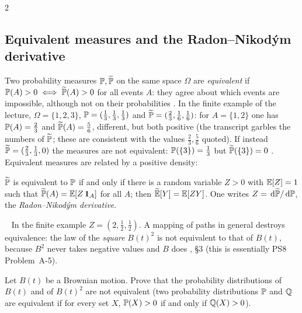 \begin{paracol}{2}
\subsection{Equivalent measures and the Radon--Nikod\'ym derivative}
Two probability measures $\mathbb{P},\widetilde{\mathbb{P}}$ on the same space $\Omega$ are \emph{equivalent} if $\mathbb{P}(A)>0\iff\widetilde{\mathbb{P}}(A)>0$ for all events $A$: they agree about which events are impossible, although not on their probabilities
. In the finite example of the lecture, $\Omega=\{1,2,3\}$, $\mathbb{P}=(\tfrac13,\tfrac13,\tfrac13)$ and $\widetilde{\mathbb{P}}=(\tfrac23,\tfrac16,\tfrac16)$: for $A=\{1,2\}$ one has $\mathbb{P}(A)=\tfrac23$ and $\widetilde{\mathbb{P}}(A)=\tfrac56$, different, but both positive
(the transcript garbles the numbers of $\widetilde{\mathbb{P}}$; these are consistent with the values $\tfrac23,\tfrac56$ quoted). If instead $\widetilde{\mathbb{P}}=(\tfrac23,\tfrac13,0)$ the measures are not equivalent: $\mathbb{P}(\{3\})=\tfrac13$ but $\widetilde{\mathbb{P}}(\{3\})=0$
. Equivalent measures are related by a positive density:

\begin{theorem}\label{ch17:thm-rn}
$\widetilde{\mathbb{P}}$ is equivalent to $\mathbb{P}$ if and only if there is a random variable $Z>0$ with $\mathbb{E}[Z]=1$ such that $\widetilde{\mathbb{P}}(A)=\mathbb{E}[Z\,\mathbf{1}_A]$ for all $A$; then $\widetilde{\mathbb{E}}[Y]=\mathbb{E}[ZY]$. One writes $Z=\,\mathrm{d}\widetilde{\mathbb{P}}/\,\mathrm{d}\mathbb{P}$, the \emph{Radon--Nikod\'ym derivative}.
\end{theorem}
\ \noindent
In the finite example $Z=(2,\tfrac12,\tfrac12)$. A mapping of paths in general destroys equivalence: the law of the \emph{square} $B(t)^2$ is not equivalent to that of $B(t)$, because $B^2$ never takes negative values and $B$ does , \S3 (this is essentially PS8 Problem~A-5).

\begin{exercise}\label{ch17:ex-a5}
Let $B(t)$ be a Brownian motion. Prove that the probability distributions of $B(t)$ and of $B(t)^2$ are not equivalent (two probability distributions $\mathbb{P}$ and $\mathbb{Q}$ are equivalent if for every set $X$, $\mathbb{P}(X)>0$ if and only if $\mathbb{Q}(X)>0$).
\end{exercise}


\end{paracol}

